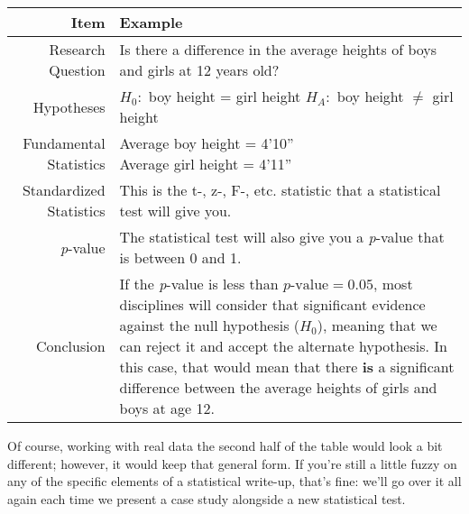 \begin{center}
\begin{tabular}{r l}
Item & Example \\
\hline
Research Question & \parbox[t]{0.6\textwidth}{Is there a difference in the average heights of boys and girls at 12 years old?}\\
Hypotheses & \parbox[t]{0.6\textwidth}{$H_0:$ boy height = girl height\\$H_A:$ boy height $\neq$ girl height}\\
Fundamental Statistics & \parbox[t]{0.6\textwidth}{Average boy height = 4'10'' \\ Average girl height = 4'11''}\\
Standardized Statistics & \parbox[t]{0.6\textwidth}{This is the t-, z-, F-, etc. statistic that a statistical test will give you.}\\
\textit{p}-value & \parbox[t]{0.6\textwidth}{The statistical test will also give you a \textit{p}-value that is between 0 and 1.}\\
Conclusion & \parbox[t]{0.6\textwidth}{If the \textit{p}-value is less than $p\text{-value}=0.05$, most disciplines will consider that significant evidence against the null hypothesis ($H_0$), meaning that we can reject it and accept the alternate hypothesis. In this case, that would mean that there \textbf{is} a significant difference between the average heights of girls and boys at age 12.}
\end{tabular}
\end{center}

Of course, working with real data the second half of the table would look a bit different; however, it would keep that general form. If you're still a little fuzzy on any of the specific elements of a statistical write-up, that's fine: we'll go over it all again each time we present a case study alongside a new statistical test.

